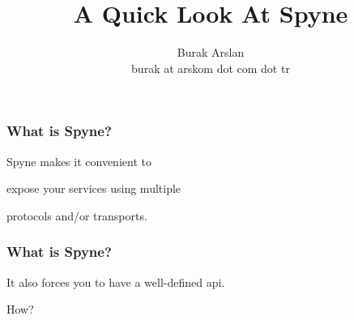\documentclass{beamer}
\title{A Quick Look At Spyne}
\author{Burak Arslan \\ \small burak at arskom \small{dot} com \small{dot} tr}
\begin{document}
\begin{frame}
  \maketitle
\end{frame}

\begin{frame}
  \frametitle{What is Spyne?}

  \LARGE
  \begin{center}

    Spyne makes it convenient to

    \bigskip

    expose your services using multiple

    \bigskip

    protocols and/or transports.

  \end{center}

\end{frame}


%
%
%
%
%
%
%
%


\begin{frame}
  \frametitle{What is Spyne?}

  \LARGE
  \begin{center}

    It also forces you to have a well-defined api.

%
%
%
%

  \end{center}

\end{frame}


\begin{frame}
\Huge
\begin{center}

  How?

\end{center}

\end{frame}
\end{document}

